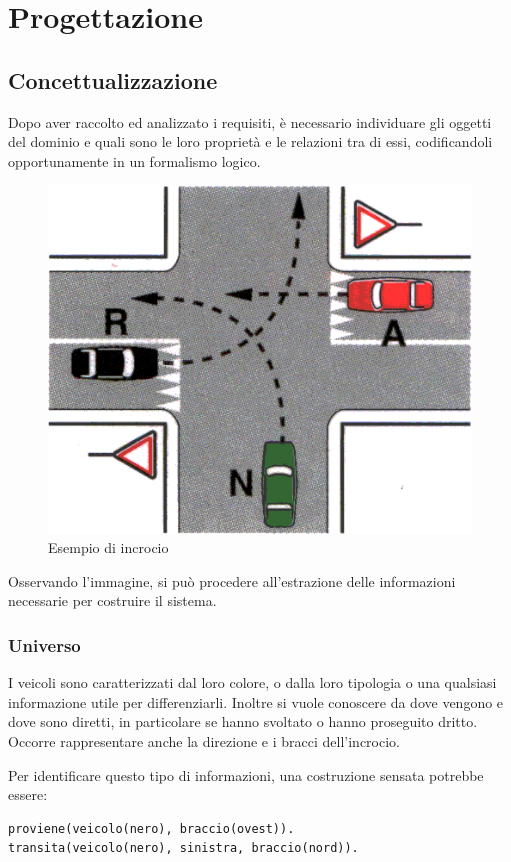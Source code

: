\chapter{Progettazione}

\section{Concettualizzazione}
Dopo aver raccolto ed analizzato i requisiti, è necessario individuare gli oggetti del dominio e quali sono le loro proprietà e le relazioni tra di essi, codificandoli opportunamente in un formalismo logico.


\begin{figure}[htb]
	\centering
	\includegraphics[width=.5\textwidth]{images/example}
	\caption{Esempio di incrocio}
\end{figure}


Osservando l'immagine, si può procedere all'estrazione delle informazioni necessarie per costruire il sistema.

\subsection{Universo}

I veicoli sono caratterizzati dal loro colore, o dalla loro tipologia o una qualsiasi informazione utile per differenziarli. Inoltre si vuole conoscere da dove vengono e dove sono diretti, in particolare se hanno svoltato o hanno proseguito dritto. Occorre rappresentare anche la direzione e i bracci dell'incrocio.

Per identificare questo tipo di informazioni, una costruzione sensata potrebbe essere:
\begin{verbatim}
proviene(veicolo(nero), braccio(ovest)).
transita(veicolo(nero), sinistra, braccio(nord)).
\end{verbatim}

